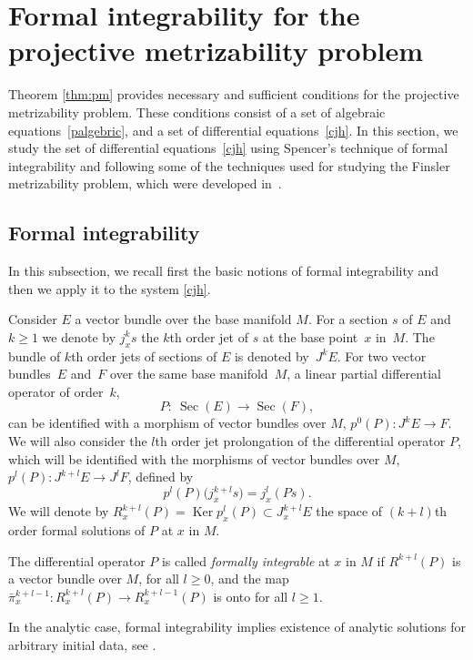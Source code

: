 \documentclass[11pt]{article}
\numberwithin{equation}{section}
\begin{document}
\section{Formal integrability for the projective metrizability problem}
\label{sec:fi}

Theorem \ref{thm:pm} provides necessary and suf\/f\/icient conditions for the projective
metrizability problem. These conditions consist of a set of algebraic equations~\eqref{palgebric},
and a set of dif\/ferential equations~\eqref{cjh}. In this section,
we study the set of dif\/ferential equations~\eqref{cjh} using Spencer's
technique of formal integrability \cite{BCG91, grifone00}  and following some of the techniques
used for studying the Finsler metrizability problem, which were developed in~\cite{muzsnay06}.


\subsection{Formal integrability} \label{subsec:fi}
In this subsection, we recall f\/irst the basic notions of formal integrability
\cite{BCG91, grifone00} and then we apply it to the system \eqref{cjh}.

Consider $E$ a vector bundle over the base manifold $M$. For a
section $s$ of $E$ and $k\geq 1$ we denote by $j^k_xs$ the $k$th
order jet of $s$ at the base point~$x$ in~$M$. The bundle of $k$th
order jets of sections of $E$ is denoted by~$J^kE$. For two vector
bundles~$E$ and~$F$ over the same base manifold~$M$, a linear
partial dif\/ferential operator of order~$k$,
\[
P: \  \operatorname{Sec}(E) \to \operatorname{Sec}(F),
\]  can be identif\/ied with a morphism of vector
bundles over $M$, $p^{0}(P): J^{k}E \to
F$. We will also consider the $l$th order jet prolongation of the dif\/ferential
operator $P$, which will be identif\/ied with the morphisms of vector bundles
over $M$, $p^{l}(P): J^{k+l}E \to J^lF$, def\/ined by
\[
p^{l}(P)\big(j^{k+l}_xs\big)=j^l_x(Ps).
\] We will denote by
$R^{k+l}_x(P)=\operatorname{Ker} p_x^{l}(P)\subset J^{k+l}_xE$ the
space of $(k+l)$th order formal solutions of $P$ at $x$ in $M$.
\begin{Definition} \label{def:fi} The dif\/ferential operator $P$ is called \emph{formally integrable} at
$x$ in $M$ if $R^{k+l}(P)$ is a vector bundle over $M$, for all $l\geq 0$,
and the map $\bar{\pi}^{k+l-1}_x: R^{k+l}_x(P) \to R^{k+l-1}_x(P)$ is onto for all
$l\geq 1$. \end{Definition}
In the analytic case, formal integrability implies
existence of analytic solutions for arbitrary initial data, see
\cite[p.~397]{BCG91}.
\end{document}
